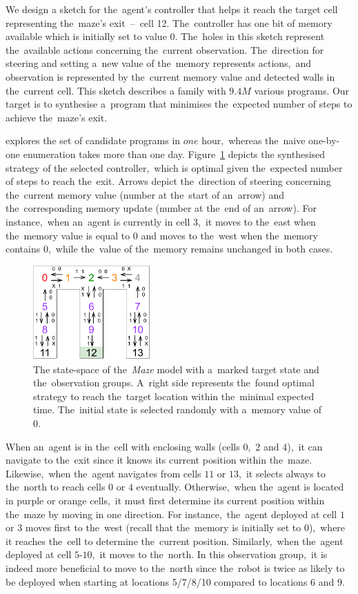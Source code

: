 We design a sketch for the~agent's controller that helps it reach the target cell representing the~maze's exit \,--\, cell 12.
The~controller has one bit of memory available which is initially set to value $0$.
The~holes in this sketch represent the~available actions concerning the~current observation.
The~direction for steering and setting a~new value of the~memory represents actions,~and observation is represented by the~current memory value and detected walls in the~current cell.
This sketch describes a family with $9.4M$ various programs.
Our target is to synthesise a~program that minimises the~expected number of steps to achieve the~maze's exit.

\toolname{} explores the set of candidate programs in $one$ hour,~whereas the~naive one-by-one enumeration takes more than one day.
Figure~\ref{fig:maze} depicts the synthesised strategy of the selected controller,~which is optimal given the~expected number of steps to reach the~exit.
Arrows depict the~direction of steering concerning the~current memory value (number at the~start of an~arrow) and the~corresponding memory update (number at the~end of an~arrow).
For instance,~when an~agent is currently in cell $3$,~it moves to the~east when the~memory value is equal to $0$ and moves to the~west when the~memory contains 0,~while the~value of the~memory remains unchanged in both cases.

\begin{figure}[h!]
\centering
\includegraphics[width=0.4\textwidth]{figures/maze.pdf}
\caption{The state-space of the~\textit{Maze} model with a~marked target state and the~observation groups. A~right side represents the~found optimal strategy to reach the~target location within the~minimal expected time. The~initial state is selected randomly with a~memory value of 0.}%
\label{fig:maze}%
\end{figure}

When an~agent is in the~cell with enclosing walls (cells 0,~2 and 4),~it can navigate to the~exit since it knows its current position within the~maze.
Likewise,~when the~agent navigates from cells $11$ or $13$,~it selects always to the~north to reach cells $0$ or $4$ eventually.
Otherwise,~when the~agent is located in purple or orange cells,~it must first determine its current position within the~maze by moving in one direction.
For instance,~the~agent deployed at cell $1$ or $3$ moves first to the~west (recall that the~memory is initially set to 0),~where it reaches the~cell to determine the~current position.
Similarly,~when the~agent deployed at cell $5$-$10$,~it moves to the~north.
In this observation group,~it is indeed more beneficial to move to the~north since the~robot is twice as likely to be deployed when starting at locations 5/7/8/10 compared to locations 6 and 9.

